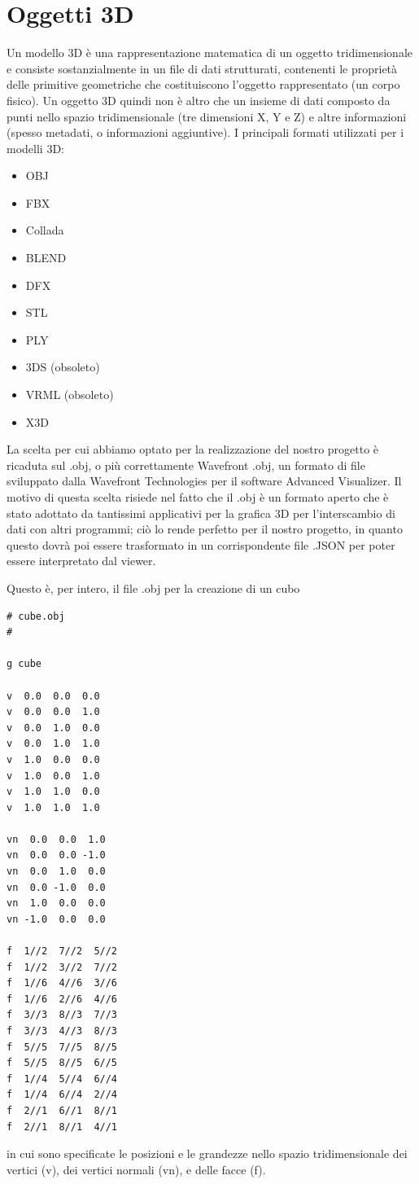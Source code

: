 \section{Oggetti 3D}
Un modello 3D è una rappresentazione matematica di un oggetto tridimensionale e consiste sostanzialmente in un file di dati strutturati, contenenti le proprietà delle primitive geometriche che costituiscono l'oggetto rappresentato (un corpo fisico). Un oggetto 3D quindi non è altro che un insieme di dati composto da punti nello spazio tridimensionale (tre dimensioni X, Y e Z) e altre informazioni (spesso metadati, o informazioni aggiuntive).
I principali formati utilizzati per i modelli 3D:
\begin{itemize}
	\item OBJ
	\item FBX
	\item Collada
	\item BLEND
	\item DFX
	\item STL
	\item PLY
	\item 3DS (obsoleto)
	\item VRML (obsoleto)
	\item X3D
\end{itemize}
La scelta per cui abbiamo optato per la realizzazione del nostro progetto è ricaduta sul .obj, o più correttamente Wavefront .obj, un formato di file sviluppato dalla Wavefront Technologies per il software Advanced Visualizer. Il motivo di questa scelta risiede nel fatto che il .obj è un formato aperto che è stato adottato da tantissimi applicativi per la grafica 3D per l'interscambio di dati con altri programmi; ciò lo rende perfetto per il nostro progetto, in quanto questo dovrà poi essere trasformato in un corrispondente file .JSON per poter essere interpretato dal viewer\cite{upv}.

Questo è, per intero, il file .obj per la creazione di un cubo

\begin{lstlisting}[caption={Cube.obj}, style=JavaScriptCode]
# cube.obj
#

g cube

v  0.0  0.0  0.0
v  0.0  0.0  1.0
v  0.0  1.0  0.0
v  0.0  1.0  1.0
v  1.0  0.0  0.0
v  1.0  0.0  1.0
v  1.0  1.0  0.0
v  1.0  1.0  1.0

vn  0.0  0.0  1.0
vn  0.0  0.0 -1.0
vn  0.0  1.0  0.0
vn  0.0 -1.0  0.0
vn  1.0  0.0  0.0
vn -1.0  0.0  0.0

f  1//2  7//2  5//2
f  1//2  3//2  7//2 
f  1//6  4//6  3//6 
f  1//6  2//6  4//6 
f  3//3  8//3  7//3 
f  3//3  4//3  8//3 
f  5//5  7//5  8//5 
f  5//5  8//5  6//5 
f  1//4  5//4  6//4 
f  1//4  6//4  2//4 
f  2//1  6//1  8//1 
f  2//1  8//1  4//1 
\end{lstlisting}
in cui sono specificate le posizioni e le grandezze nello spazio tridimensionale dei vertici (v), dei vertici normali (vn), e delle facce (f).


